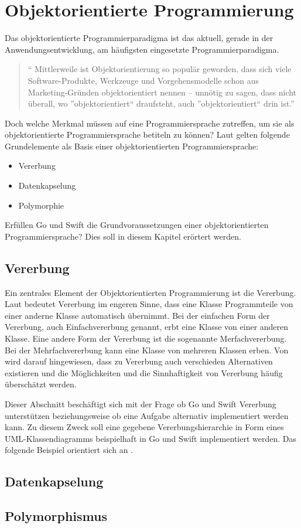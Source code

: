 \chapter{Objektorientierte Programmierung}
Das objektorientierte Programmierparadigma ist das aktuell, gerade in der Anwendungsentwicklung, am häufigsten eingesetzte Programmierparadigma.

\begin{quote}
\enquote{
Mittlerweile ist Objektorientierung so populär geworden, dass sich viele Software-Produkte, Werkzeuge und Vorgehensmodelle schon aus Marketing-Gründen objektorientiert nennen – unnötig zu sagen, dass nicht überall, wo ”objektorientiert“ draufsteht, auch ”objektorientiert“ drin ist.} 
\cite[S.16]{PoetzschHeffter.2009}
\end{quote}

Doch welche Merkmal müssen auf eine Programmiersprache zutreffen, um sie als objektorientierte Programmiersprache betiteln zu können?
Laut \cite{Lahres.2011} gelten folgende Grundelemente als Basis einer objektorientierten Programmiersprache:

\begin{itemize}
    \item Vererbung
    \item Datenkapselung
    \item Polymorphie
\end{itemize}

Erfüllen Go und Swift die Grundvoraussetzungen einer objektorientierten Programmiersprache? Dies soll in diesem Kapitel erörtert werden.

\section{Vererbung}
Ein zentrales Element der Objektorientierten Programmierung ist die Vererbung. 
Laut \cite[S. 145]{PoetzschHeffter.2009} bedeutet Vererbung im engeren Sinne, dass eine Klasse Programmteile von einer anderne Klasse automatisch übernimmt. 
Bei der einfachen Form der Vererbung, auch Einfachvererbung genannt, erbt eine Klasse von einer anderen Klasse.
Eine andere Form der Vererbung ist die sogenannte Merfachvererbung. 
Bei der Mehrfachvererbung kann eine Klasse von mehreren Klassen erben.
Von \cite[S.41]{Oestereich.1999} wird darauf hingewiesen, dass zu Vererbung auch verschieden Alternativen existieren und die Möglichkeiten und die Sinnhaftigkeit von Vererbung häufig überschätzt werden.


Dieser Abschnitt beschäftigt sich mit der Frage ob Go und Swift Vererbung unterstützen beziehungsweise ob eine Aufgabe alternativ implementiert werden kann.
Zu diesem Zweck soll eine gegebene Vererbungshierarchie in Form eines UML-Klassendiagramms beispielhaft in Go und Swift implementiert werden. 
Das folgende Beispiel orientiert sich an \cite[]{WilliamKennedy.2013}.


\section{Datenkapselung}




\section{Polymorphismus}